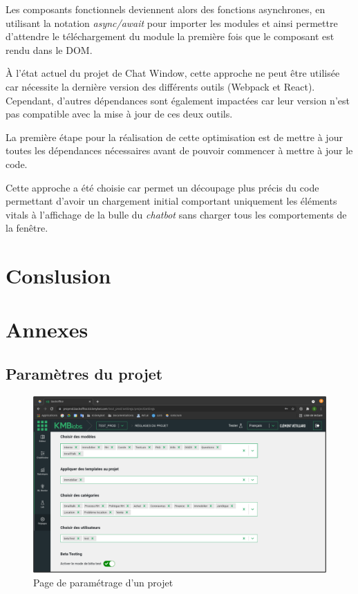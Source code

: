\documentclass[12pt,a4paper,oneside]{scrreprt}
\begin{document}
Les composants fonctionnels deviennent alors des fonctions asynchrones, en utilisant la notation \textit{async/await} pour importer les modules et ainsi permettre d'attendre le téléchargement du module la première fois que le composant est rendu dans le DOM.

\begin{info}
	À l'état actuel du projet de Chat Window, cette approche ne peut être utilisée car nécessite la dernière version des différents outils (Webpack et React). Cependant, d'autres dépendances sont également impactées car leur version n'est pas compatible avec la mise à jour de ces deux outils.

	La première étape pour la réalisation de cette optimisation est de mettre à jour toutes les dépendances nécessaires avant de pouvoir commencer à mettre à jour le code.
\end{info}

\begin{result}
	Cette approche a été choisie car permet un découpage plus précis du code permettant d'avoir un chargement initial comportant uniquement les éléments vitals à l'affichage de la bulle du \textit{chatbot} sans charger tous les comportements de la fenêtre.
\end{result}

\chapter{Conslusion}

\chapter{Annexes}

\section{Paramètres du projet}

\begin{figure}[!ht]
	\centering
	\includegraphics[width=\textwidth]{pictures/template_selector.png}
	\caption{Page de paramétrage d'un projet}
	\label{fig:parameters}
\end{figure}
\end{document}

